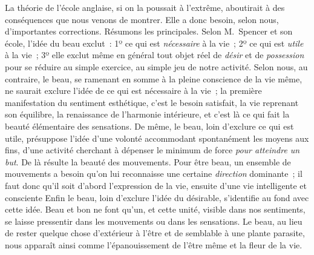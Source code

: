 \documentclass[french,twoside]{book} %
\begin{document}
La théorie de l’école anglaise, si on la poussait à l’extrême, aboutirait à des conséquences que nous venons de montrer. Elle a donc besoin, selon nous, d’importantes  corrections. Résumons les principales. Selon M. Spencer et son école, l’idée du beau exclut : 1º ce qui est \emph{nécessaire} à la vie ; 2º ce qui est \emph{utile} à la vie ; 3º elle exclut même en général tout objet réel de \emph{désir} et de \emph{possession} pour se réduire au simple exercice, au simple jeu de notre activité. Selon nous, au contraire, le beau, se ramenant en somme à la pleine conscience de la vie même, ne saurait exclure l’idée de ce qui est nécessaire à la vie ; la première manifestation du sentiment esthétique, c’est le besoin satisfait, la vie reprenant son équilibre, la renaissance de l’harmonie intérieure, et c’est là ce qui fait la beauté élémentaire des sensations. De même, le beau, loin d’exclure ce qui est utile, présuppose l’idée d’une volonté accommodant spontanément les moyens aux fins, d’une activité cherchant à dépenser le minimum de force \emph{pour atteindre un but}. De là résulte la beauté des mouvements. Pour être beau, un ensemble de mouvements a besoin qu’on lui reconnaisse une certaine \emph{direction} dominante ; il faut donc qu’il soit d’abord l’expression de la vie, ensuite d’une vie intelligente et consciente Enfin le beau, loin d’exclure l’idée du désirable, s’identifie au fond avec cette idée. Beau et bon ne font qu’un, et cette unité, visible dans nos sentiments, se laisse pressentir dans les mouvements ou dans les sensations. Le beau, au lieu de rester quelque chose d’extérieur à l’être et de semblable à une plante parasite, nous apparaît ainsi comme l’épanouissement de l’être même et la fleur de la vie.\par
\par
\end{document}
